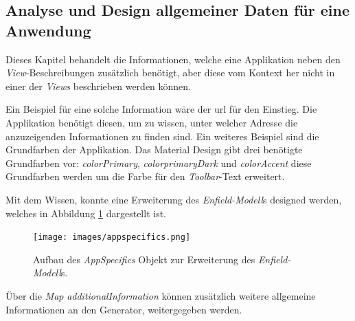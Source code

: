 \subsection{Analyse und Design allgemeiner Daten für eine Anwendung}

Dieses Kapitel behandelt die Informationen, welche eine Applikation neben den \textit{View}-Beschreibungen zusätzlich benötigt, aber diese vom Kontext her nicht in einer der \textit{Views} beschrieben werden können.

Ein Beispiel für eine solche Information wäre der \acf{url} für den Einstieg. Die Applikation benötigt diesen, um zu wissen, unter welcher Adresse die anzuzeigenden Informationen zu finden sind. Ein weiteres Beispiel sind die Grundfarben der Applikation. Das Material Design gibt drei benötigte Grundfarben vor: \textit{colorPrimary}, \textit{colorprimaryDark} und \textit{colorAccent} diese Grundfarben werden um die Farbe für den \textit{Toolbar}-Text erweitert.

Mit dem Wissen, konnte eine Erweiterung des \textit{Enfield-Modell}s designed werden, welches in Abbildung \ref{fig:appspecifics} dargestellt ist.

\begin{figure}[H]
	\begin{center}
		\texttt{[image: images/appspecifics.png]}
		\caption{Aufbau des \textit{AppSpecifics} Objekt  zur Erweiterung des \textit{Enfield-Modell}s.}
		\label{fig:appspecifics}
	\end{center}
\end{figure}

Über die \textit{Map} \textit{additionalInformation} können zusätzlich weitere allgemeine Informationen an den Generator, weitergegeben werden.
